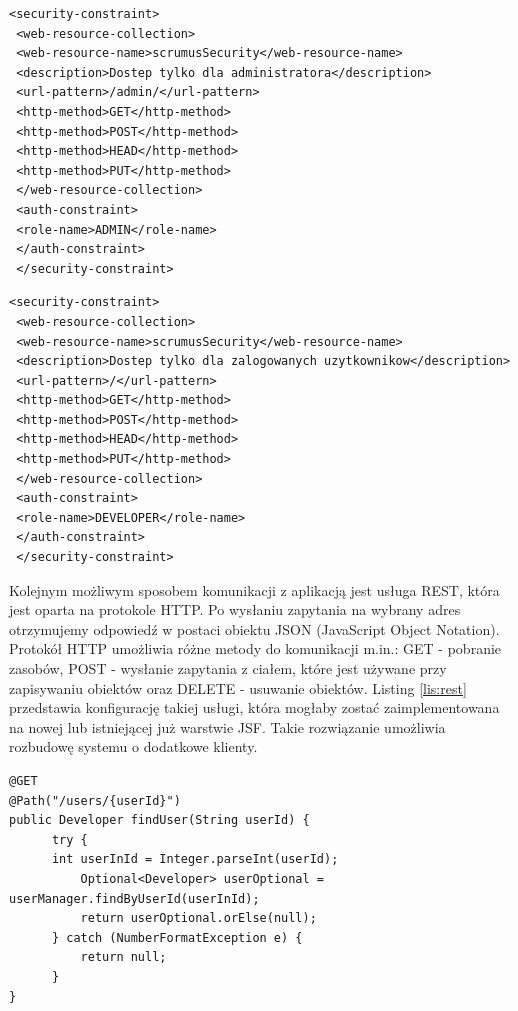 \begin{lstlisting}[caption={Konfiguracja zabezpieczeń systemu scrumus - administrator}, label=lis:konf_zab_ad, numbers=none]
 <security-constraint>
 <web-resource-collection>
 <web-resource-name>scrumusSecurity</web-resource-name>
 <description>Dostep tylko dla administratora</description>
 <url-pattern>/admin/</url-pattern>
 <http-method>GET</http-method>
 <http-method>POST</http-method>
 <http-method>HEAD</http-method>
 <http-method>PUT</http-method>
 </web-resource-collection>
 <auth-constraint>
 <role-name>ADMIN</role-name>
 </auth-constraint>
 </security-constraint>
 \end{lstlisting}
 \newpage
 \begin{lstlisting}[caption={Konfiguracja zabezpieczeń systemu scrumus - zalogowany użytkownik}, label=lis:konf_zab_zal, numbers=none]
 <security-constraint>
 <web-resource-collection>
 <web-resource-name>scrumusSecurity</web-resource-name>
 <description>Dostep tylko dla zalogowanych uzytkownikow</description>
 <url-pattern>/</url-pattern>
 <http-method>GET</http-method>
 <http-method>POST</http-method>
 <http-method>HEAD</http-method>
 <http-method>PUT</http-method>
 </web-resource-collection>
 <auth-constraint>
 <role-name>DEVELOPER</role-name>
 </auth-constraint>
 </security-constraint>\end{lstlisting}
 
 
 Kolejnym możliwym sposobem komunikacji z aplikacją jest usługa REST, która jest oparta na protokole HTTP. Po wysłaniu zapytania na wybrany adres otrzymujemy odpowiedź w postaci obiektu JSON (JavaScript Object Notation). Protokół HTTP umożliwia różne metody do komunikacji m.in.: GET - pobranie zasobów, POST - wysłanie zapytania z ciałem, które jest używane przy zapisywaniu obiektów oraz DELETE - usuwanie obiektów. Listing \ref{lis:rest} przedstawia konfigurację takiej usługi, która mogłaby zostać zaimplementowana na nowej lub istniejącej już warstwie JSF. Takie rozwiązanie umożliwia rozbudowę systemu o dodatkowe klienty.

\begin{lstlisting}[caption={Przykładowa usługa REST}, label=lis:rest, numbers=none]
@GET
@Path("/users/{userId}")
public Developer findUser(String userId) {
	  try {
	  int userInId = Integer.parseInt(userId);
		  Optional<Developer> userOptional = userManager.findByUserId(userInId);
		  return userOptional.orElse(null);
	  } catch (NumberFormatException e) {
		  return null;
	  }
}
\end{lstlisting}


